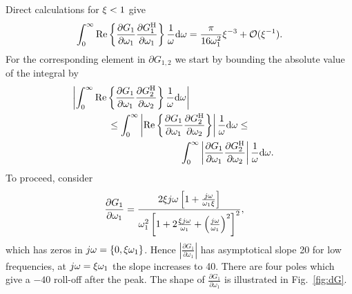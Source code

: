 Direct calculations for $\xi < 1$ give
\begin{align}
\label{eq:auto}
\int_0^\infty\mathrm{Re}\left\{\frac{\partial G_1}{\partial \omega_1}\frac{\partial G_1^{\mathrm{H}}}{\partial \omega_1}\right\}\frac{1}{\omega}\mathrm{d}\omega = \frac{\pi}{16\omega_1^2}\xi^{-3} + \mathcal{O}(\xi^{-1}).
\end{align}
For the corresponding element in $\partial G_{1,2}$ we start by bounding the absolute value of the integral by
\begin{gather}
\left|\int_0^\infty\mathrm{Re}\left\{\frac{\partial G_1}{\partial \omega_1}\frac{\partial G_2^{\mathrm{H}}}{\partial \omega_2}\right\}\frac{1}{\omega}\mathrm{d}\omega\right|
\qquad \qquad \qquad \qquad \qquad
\label{eq:cross1} \\
\leq
\int_0^\infty\left|\mathrm{Re}\left\{\frac{\partial G_1}{\partial \omega_1}\frac{\partial G_2^{\mathrm{H}}}{\partial \omega_2}\right\}\right|\frac{1}{\omega}\mathrm{d}\omega
\leq \\
\qquad \qquad \qquad \qquad \qquad
\int_0^\infty\left|\frac{\partial G_1}{\partial \omega_1}\frac{\partial G_2^{\mathrm{H}}}{\partial \omega_2}\right|\frac{1}{\omega}\mathrm{d}\omega \text{.}\label{eq:cross}
\end{gather}
To proceed, consider
\begin{align}
\frac{\partial G_1}{\partial \omega_1} &= \frac{2\xi j\omega\left[1+\frac{j\omega}{\omega_1\xi}\right]}{\omega_1^2\left[1+2\frac{\xi j\omega}{\omega_1} + \left(\frac{j\omega}{\omega_1}\right)^2\right]^2},
\end{align}
which has zeros in $j\omega=\left\{0, \xi\omega_1\right\}$. Hence $\left|\frac{\partial G_1}{\partial \omega_1} \right|$ has asymptotical slope 20\unit{} for low frequencies, at $j\omega=\xi\omega_1$ the slope increases to 40\unit{}. There are four poles which give a $-40$\unit{} roll-off after the peak. The shape of $\frac{\partial G_1}{\partial \omega_1} $ is illustrated in Fig.~\ref{fig:dG}.

